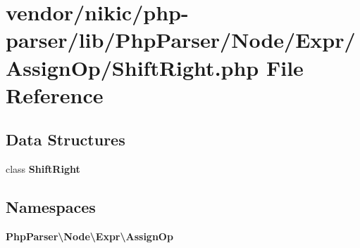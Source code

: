 \section{vendor/nikic/php-\/parser/lib/\+Php\+Parser/\+Node/\+Expr/\+Assign\+Op/\+Shift\+Right.php File Reference}
\label{_assign_op_2_shift_right_8php}
\subsection*{Data Structures}
\begin{DoxyCompactItemize}
\item 
class {\bf Shift\+Right}
\end{DoxyCompactItemize}
\subsection*{Namespaces}
\begin{DoxyCompactItemize}
\item 
 {\bf Php\+Parser\textbackslash{}\+Node\textbackslash{}\+Expr\textbackslash{}\+Assign\+Op}
\end{DoxyCompactItemize}
